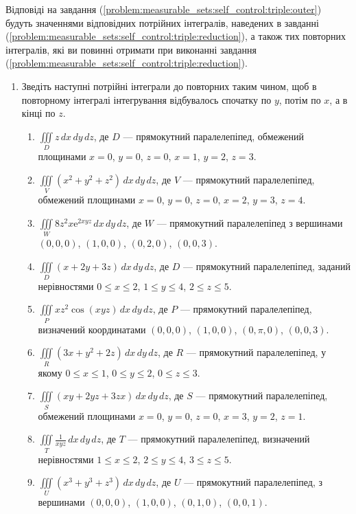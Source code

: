 Відповіді на завдання (\ref{problem:measurable_sets:self_control:triple:outer}) будуть значеннями відповідних потрійних інтегралів, наведених в завданні (\ref{problem:measurable_sets:self_control:triple:reduction}), а також тих повторних інтегралів, які ви повинні отримати при виконанні завдання (\ref{problem:measurable_sets:self_control:triple:reduction}).
\begin{enumerate}
\item\label{problem:measurable_sets:self_control:triple:reduction} Зведіть наступні потрійні інтеграли до повторних таким чином, щоб в повторному інтегралі інтегрування відбувалось спочатку по $y$, потім по $x$, а в кінці по $z$.
    \begin{enumerate}[label*=\arabic*.]
        \item $\iiint\limits_D z \,dx\,dy\,dz$, де $D$ --- прямокутний паралелепіпед, обмежений площинами $x = 0$, $y = 0$, $z = 0$, $x = 1$, $y = 2$, $z = 3$.
        \item  $\iiint\limits_{V} \left(x^2 + y^2 + z^2\right) \, dx \, dy \, dz$, де $V$ --- прямокутний паралелепіпед, обмежений площинами $x = 0$, $y = 0$, $z = 0$, $x = 2$, $y = 3$, $z = 4$.
        \item $\iiint\limits_{W} 8 z^{2} x {\mathrm e}^{2 x y z} \, dx \, dy \, dz$, де $W$ --- прямокутний паралелепіпед з вершинами $(0,0,0)$, $(1,0,0)$, $(0,2,0)$, $(0,0,3)$.
        \item $\iiint\limits_{D} \left(x + 2y + 3z\right) \, dx \, dy \, dz$, де $D$ --- прямокутний паралелепіпед, заданий нерівностями $0 \leq x \leq 2$, $1 \leq y \leq 4$, $2 \leq z \leq 5$.
        \item  $\iiint\limits_{P} x z^{2} \cos\left(x y z\right) \, dx \, dy \, dz$, де $P$ --- прямокутний паралелепіпед, визначений координатами $(0,0,0)$, $(1,0,0)$, $(0,\pi,0)$, $(0,0,3)$.
        \item $\iiint\limits_{R} \left(3x + y^2 + 2z\right) \, dx \, dy \, dz$, де $R$ --- прямокутний паралелепіпед, у якому $0 \leq x \leq 1$, $0 \leq y \leq 2$, $0 \leq z \leq 3$.
        \item $\iiint\limits_{S} \left(xy + 2yz + 3zx\right) \, dx \, dy \, dz$, де $S$ --- прямокутний паралелепіпед, обмежений площинами $x = 0$, $y = 0$, $z = 0$, $x = 3$, $y = 2$, $z = 1$.
        \item $\iiint\limits_{T} \frac{1}{xyz} \, dx \, dy \, dz$, де $T$ --- прямокутний паралелепіпед, визначений нерівностями $1 \leq x \leq 2$, $2 \leq y \leq 4$, $3 \leq z \leq 5$.
        \item $\iiint\limits_{U} \left(x^3 + y^3 + z^3\right) \, dx \, dy \, dz$, де $U$ --- прямокутний паралелепіпед, з вершинами $(0,0,0)$, $(1,0,0)$, $(0,1,0)$, $(0,0,1)$.

\end{enumerate}
\end{enumerate}
